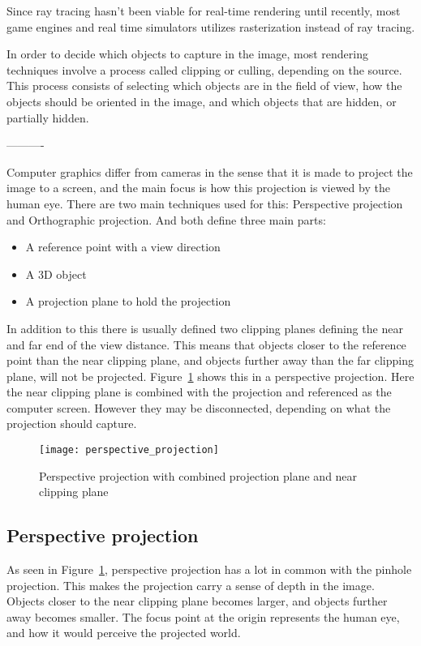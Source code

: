 Since ray tracing hasn't been viable for real-time rendering until recently, most game engines and real time simulators utilizes rasterization instead of ray tracing. 

In order to decide which objects to capture in the image, most rendering techniques involve a process called clipping or culling, depending on the source. This process consists of selecting which objects are in the field of view, how the objects should be oriented in the image, and which objects that are hidden, or partially hidden. 

----------

Computer graphics differ from cameras in the sense that it is made to project the image to a screen, and the main focus is how this projection is viewed by the human eye. There are two main techniques used for this: Perspective projection and Orthographic projection. And both define three main parts:
\begin{itemize}
    \item A reference point with a view direction
    \item A 3D object
    \item A projection plane to hold the projection
\end{itemize}

In addition to this there is usually defined two clipping planes defining the near and far end of the view distance. This means that objects closer to the reference point than the near clipping plane, and objects further away than the far clipping plane, will not be projected. Figure~\ref{fig:perspective_projection} shows this in a perspective projection. Here the near clipping plane is combined with the projection and referenced as the computer screen. However they may be disconnected, depending on what the projection should capture.

\begin{figure}[!htb]
    \centering
    \texttt{[image: perspective\_projection]}
    \caption{Perspective projection with combined projection plane and near clipping plane}
    \label{fig:perspective_projection}
\end{figure}

\subsection{Perspective projection}

As seen in Figure~\ref{fig:perspective_projection}, perspective projection has a lot in common with the pinhole projection. This makes the projection carry a sense of depth in the image. Objects closer to the near clipping plane becomes larger, and objects further away becomes smaller. The focus point at the origin represents the human eye, and how it would perceive the projected world.

